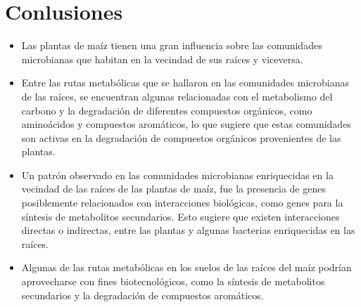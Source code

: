 \documentclass[12pt,letterpaper,oneside]{report}
\begin{document}
\section{Conlusiones}
\begin{itemize}
\item Las plantas de maíz tienen una gran influencia sobre las comunidades microbianas que habitan en la vecindad de sus raíces y viceversa.
\item Entre las rutas metabólicas que se hallaron en las comunidades microbianas de las raíces, se encuentran algunas relacionadas con el metabolismo del carbono y la degradación de diferentes compuestos orgánicos, como aminoácidos y compuestos aromáticos, lo que sugiere que estas comunidades son activas en la degradación de compuestos orgánicos provenientes de las plantas.
\item Un patrón observado en las comunidades microbianas enriquecidas en la vecindad de las raíces de las plantas de maíz, fue la presencia de genes posiblemente relacionados con interacciones biológicas, como genes para la síntesis de metabolitos secundarios. Esto sugiere que existen interacciones directas o indirectas, entre las plantas y algunas bacterias enriquecidas en las raíces. 
\item Algunas de las rutas metabólicas en los suelos de las raíces del maíz podrían aprovecharse con fines biotecnológicos, como la síntesis de metabolitos secundarios y la degradación de compuestos aromáticos.
\end{itemize}
\newpage
\end{document}
